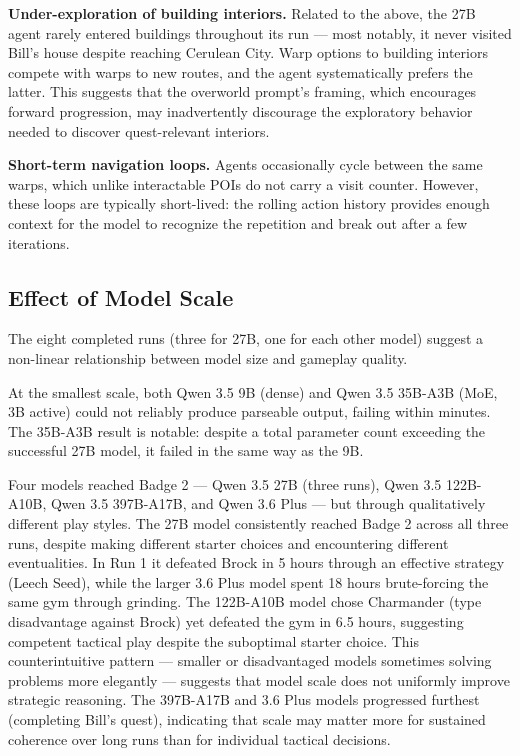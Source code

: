\documentclass{article}
\begin{document}
\textbf{Under-exploration of building interiors.} Related to the above, the 27B agent rarely entered buildings throughout its run --- most notably, it never visited Bill's house despite reaching Cerulean City. Warp options to building interiors compete with warps to new routes, and the agent systematically prefers the latter. This suggests that the overworld prompt's framing, which encourages forward progression, may inadvertently discourage the exploratory behavior needed to discover quest-relevant interiors.

\textbf{Short-term navigation loops.} Agents occasionally cycle between the same warps, which unlike interactable POIs do not carry a visit counter. However, these loops are typically short-lived: the rolling action history provides enough context for the model to recognize the repetition and break out after a few iterations.

\subsection{Effect of Model Scale}

The eight completed runs (three for 27B, one for each other model) suggest a non-linear relationship between model size and gameplay quality.

At the smallest scale, both Qwen 3.5 9B (dense) and Qwen 3.5 35B-A3B (MoE, 3B active) could not reliably produce parseable output, failing within minutes. The 35B-A3B result is notable: despite a total parameter count exceeding the successful 27B model, it failed in the same way as the 9B.

Four models reached Badge 2 --- Qwen 3.5 27B (three runs), Qwen 3.5 122B-A10B, Qwen 3.5 397B-A17B, and Qwen 3.6 Plus --- but through qualitatively different play styles. The 27B model consistently reached Badge 2 across all three runs, despite making different starter choices and encountering different eventualities. In Run 1 it defeated Brock in 5 hours through an effective strategy (Leech Seed), while the larger 3.6 Plus model spent 18 hours brute-forcing the same gym through grinding. The 122B-A10B model chose Charmander (type disadvantage against Brock) yet defeated the gym in 6.5 hours, suggesting competent tactical play despite the suboptimal starter choice. This counterintuitive pattern --- smaller or disadvantaged models sometimes solving problems more elegantly --- suggests that model scale does not uniformly improve strategic reasoning. The 397B-A17B and 3.6 Plus models progressed furthest (completing Bill's quest), indicating that scale may matter more for sustained coherence over long runs than for individual tactical decisions.
\end{document}
